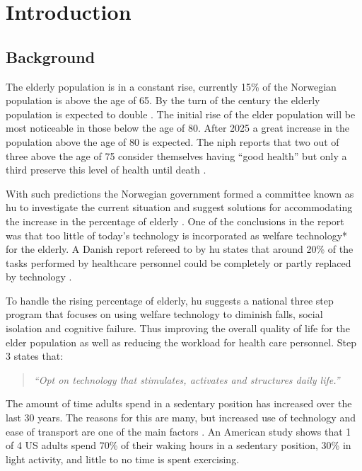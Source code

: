 \chapter{Introduction}

\section{Background}

The elderly population is in a constant rise, currently 15\% of the Norwegian population is above the age of 65. By the turn of the century the elderly population is expected to double \cite{elder}. The initial rise of the elder population will be most noticeable in those below the age of 80. After 2025 a great increase in the population above the age of 80 is expected. The \gls{niph} reports that two out of three above the age of 75 consider themselves having ``good health'' but only a third preserve this level of health until death \cite{elder}.

With such predictions the Norwegian government formed a committee known as \gls{hu} to investigate the current situation and suggest solutions for accommodating the increase in the percentage of elderly \cite{haagen}. One of the conclusions in the report was that too little of today's technology is incorporated as welfare technology* for the elderly. A Danish report refereed to by \gls{hu} states that around 20\% of the tasks performed by healthcare personnel could be completely or partly replaced by technology \cite{kmd}.

To handle the rising percentage of elderly, \gls{hu} suggests a national three step program that focuses on using welfare technology to diminish falls, social isolation and cognitive failure. Thus improving the overall quality of life for the elder population as well as reducing the workload for health care personnel. Step 3 states that:
\begin{quote}
\textit{``Opt on technology that stimulates, activates and structures daily life.''}
\end{quote}
 
The amount of time adults spend in a sedentary position has increased over the last 30 years. The reasons for this are many, but increased use of technology and ease of transport are one of the main factors \cite{sedentaryBehaviour}. An American study shows that 1 of 4 US adults spend 70\% of their waking hours in a sedentary position, 30\% in light activity, and little to no time is spent exercising.


